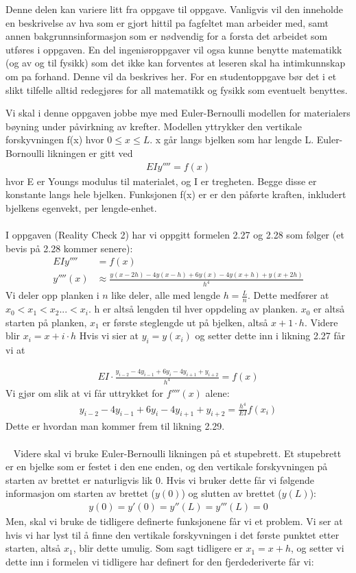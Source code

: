 Denne delen kan variere litt fra oppgave til oppgave. Vanligvis vil den inneholde en beskrivelse av hva som er gjort hittil pa fagfeltet man arbeider med, samt annen bakgrunnsinformasjon som er nødvendig for a forsta det arbeidet som utføres i oppgaven. En del ingeniøroppgaver vil ogsa kunne benytte matematikk (og av og til fysikk) som det ikke kan forventes at leseren skal ha intimkunnskap om pa forhand. Denne vil da beskrives her. For en studentoppgave bør det i et slikt tilfelle alltid redegjøres for all matematikk og fysikk som eventuelt benyttes.


Vi skal i denne oppgaven jobbe mye med Euler-Bernoulli modellen for materialers bøyning under påvirkning av krefter. Modellen yttrykker den vertikale forskyvningen f(x) hvor $0\leq x \leq L$. x går langs bjelken som har lengde L. Euler-Bornoulli likningen er gitt ved 
\begin{align}
    EIy''''=f(x)
\end{align}
hvor E er Youngs modulus til materialet, og I er tregheten. Begge disse er konstante langs hele bjelken. Funksjonen f(x) er er den påførte kraften, inkludert bjelkens egenvekt, per lengde-enhet. 
\\ \\
I oppgaven (Reality Check 2) har vi oppgitt formelen 2.27 og 2.28 som følger (et bevis på 2.28 kommer senere): 
\begin{align}
    EIy''''&=f(x) \nonumber \\
    y''''(x)& \approx \frac{y(x-2h)-4y(x-h)+6y(x)-4y(x+h)+y(x+2h)}{h^4}
\end{align}
Vi deler opp planken i $n$ like deler, alle med lengde $h=\frac{L}{n}$. Dette medfører at $x_0<x_1<x_2...<x_i$. h er altså lengden til hver oppdeling av planken. $x_0$ er altså starten på planken, $x_1$ er første steglengde ut på bjelken, altså $x+1\cdot h$. Videre blir $x_i=x+i\cdot h$ Hvis vi sier at $y_i=y(x_i)$ og setter dette inn i likning 2.27 får vi at 

\begin{align}
EI\cdot	\frac{y_{i-2}-4y_{i-1}+6y_i-4y_{i+1}+y_{i+2}}{h^4}=f(x)
\end{align}
Vi gjør om slik at vi får uttrykket for $f''''(x)$ alene: 
\begin{align}
    y_{i-2}-4y_{i-1}+6y_i-4y_{i+1}+y_{i+2}=\frac{h^4}{EI}f(x_i)
\end{align}
Dette er hvordan man kommer frem til likning 2.29. 
\\ \\ 
Videre skal vi bruke Euler-Bernoulli likningen på et stupebrett. Et stupebrett er en bjelke som er festet i den ene enden, og den vertikale forskyvningen på starten av brettet er naturligvis lik 0. Hvis vi bruker dette får vi følgende informasjon om starten av brettet ($y(0)$) og slutten av brettet ($y(L)$):
\begin{align}
    y(0)=y'(0)=y''(L)=y'''(L)=0
\end{align}
Men, skal vi bruke de tidligere definerte funksjonene får vi et problem. Vi ser at hvis vi har lyst til å finne den vertikale forskyvningen i det første punktet etter starten, altså $x_1$, blir dette umulig. Som sagt tidligere er $x_1=x+h$, og setter vi dette inn i formelen vi tidligere har definert for den fjerdederiverte får vi: 

